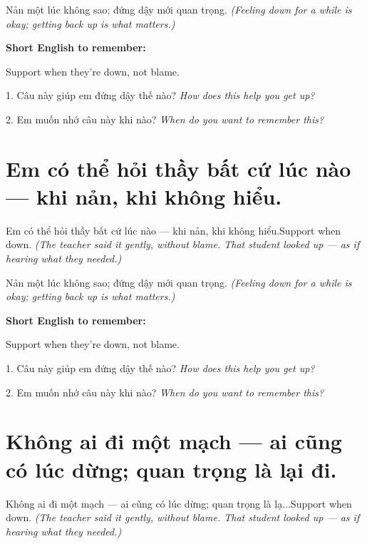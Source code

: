 \begin{baihoc}
Nản một lúc không sao; đứng dậy mới quan trọng.
\textit{(Feeling down for a while is okay; getting back up is what matters.)}
\end{baihoc}

\begin{ghinhoanh}
\textbf{Short English to remember:}

Support when they're down, not blame.

\end{ghinhoanh}

\begin{tuhocnhanh}
1. Câu này giúp em đứng dậy thế nào? \textit{How does this help you get up?}

2. Em muốn nhớ câu này khi nào? \textit{When do you want to remember this?}
\end{tuhocnhanh}
\ngancach


\section{Em có thể hỏi thầy bất cứ lúc nào — khi nản, khi không hiểu.}
\begin{truyen}{Em có thể hỏi thầy bất cứ lúc nào — khi nản, khi không hiểu.}{Support when down.}
\textit{(The teacher said it gently, without blame. That student looked up — as if hearing what they needed.)}
\end{truyen}

\begin{baihoc}
Nản một lúc không sao; đứng dậy mới quan trọng.
\textit{(Feeling down for a while is okay; getting back up is what matters.)}
\end{baihoc}

\begin{ghinhoanh}
\textbf{Short English to remember:}

Support when they're down, not blame.

\end{ghinhoanh}

\begin{tuhocnhanh}
1. Câu này giúp em đứng dậy thế nào? \textit{How does this help you get up?}

2. Em muốn nhớ câu này khi nào? \textit{When do you want to remember this?}
\end{tuhocnhanh}
\ngancach


\section{Không ai đi một mạch — ai cũng có lúc dừng; quan trọng là lại đi.}
\begin{truyen}{Không ai đi một mạch — ai cũng có lúc dừng; quan trọng là lạ...}{Support when down.}
\textit{(The teacher said it gently, without blame. That student looked up — as if hearing what they needed.)}
\end{truyen}

